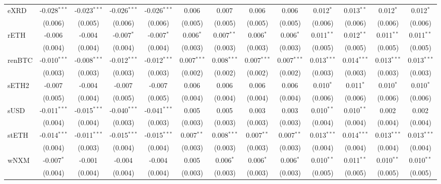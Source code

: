 \begin{table}[!htbp]
\begin{tabular}{@{\extracolsep{5pt}}lcccccccccccc}
 eXRD & -0.028$^{***}$ & -0.023$^{***}$ & -0.026$^{***}$ & -0.026$^{***}$ & 0.006$^{}$ & 0.007$^{}$ & 0.006$^{}$ & 0.006$^{}$ & 0.012$^{*}$ & 0.013$^{**}$ & 0.012$^{*}$ & 0.012$^{*}$ \\
  & (0.006) & (0.005) & (0.006) & (0.006) & (0.005) & (0.005) & (0.005) & (0.005) & (0.006) & (0.006) & (0.006) & (0.006) \\
 rETH & -0.006$^{}$ & -0.004$^{}$ & -0.007$^{*}$ & -0.007$^{*}$ & 0.006$^{*}$ & 0.007$^{**}$ & 0.006$^{*}$ & 0.006$^{*}$ & 0.011$^{**}$ & 0.012$^{**}$ & 0.011$^{**}$ & 0.011$^{**}$ \\
  & (0.004) & (0.004) & (0.004) & (0.004) & (0.003) & (0.003) & (0.003) & (0.003) & (0.005) & (0.005) & (0.005) & (0.005) \\
 renBTC & -0.010$^{***}$ & -0.008$^{***}$ & -0.012$^{***}$ & -0.012$^{***}$ & 0.007$^{***}$ & 0.008$^{***}$ & 0.007$^{***}$ & 0.007$^{***}$ & 0.013$^{***}$ & 0.014$^{***}$ & 0.013$^{***}$ & 0.013$^{***}$ \\
  & (0.003) & (0.003) & (0.003) & (0.003) & (0.002) & (0.002) & (0.002) & (0.002) & (0.003) & (0.003) & (0.003) & (0.003) \\
 sETH2 & -0.007$^{}$ & -0.004$^{}$ & -0.007$^{}$ & -0.007$^{}$ & 0.006$^{}$ & 0.006$^{}$ & 0.006$^{}$ & 0.006$^{}$ & 0.010$^{*}$ & 0.011$^{*}$ & 0.010$^{*}$ & 0.010$^{*}$ \\
  & (0.005) & (0.004) & (0.005) & (0.005) & (0.004) & (0.004) & (0.004) & (0.004) & (0.006) & (0.006) & (0.006) & (0.006) \\
 sUSD & -0.011$^{***}$ & -0.015$^{***}$ & -0.040$^{***}$ & -0.041$^{***}$ & 0.005$^{}$ & 0.005$^{}$ & 0.003$^{}$ & 0.003$^{}$ & 0.010$^{**}$ & 0.010$^{**}$ & 0.002$^{}$ & 0.002$^{}$ \\
  & (0.004) & (0.004) & (0.003) & (0.003) & (0.003) & (0.003) & (0.003) & (0.003) & (0.004) & (0.004) & (0.004) & (0.004) \\
 stETH & -0.014$^{***}$ & -0.011$^{***}$ & -0.015$^{***}$ & -0.015$^{***}$ & 0.007$^{**}$ & 0.008$^{***}$ & 0.007$^{**}$ & 0.007$^{**}$ & 0.013$^{***}$ & 0.014$^{***}$ & 0.013$^{***}$ & 0.013$^{***}$ \\
  & (0.004) & (0.003) & (0.004) & (0.004) & (0.003) & (0.003) & (0.003) & (0.003) & (0.004) & (0.004) & (0.004) & (0.004) \\
 wNXM & -0.007$^{*}$ & -0.001$^{}$ & -0.004$^{}$ & -0.004$^{}$ & 0.005$^{}$ & 0.006$^{*}$ & 0.006$^{*}$ & 0.006$^{*}$ & 0.010$^{**}$ & 0.011$^{**}$ & 0.010$^{**}$ & 0.010$^{**}$ \\
  & (0.004) & (0.004) & (0.004) & (0.004) & (0.003) & (0.003) & (0.003) & (0.003) & (0.005) & (0.005) & (0.005) & (0.005) \\

\end{tabular}
\end{table}
